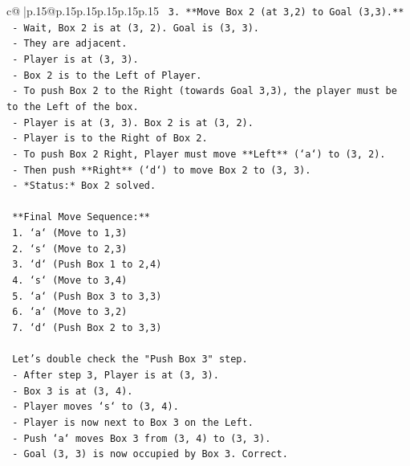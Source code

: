 \documentclass{article}
\begin{document}
{\begin{supertabular}{c@{$\;$}|p{.15\linewidth}@{}p{.15\linewidth}p{.15\linewidth}p{.15\linewidth}p{.15\linewidth}p{.15\linewidth}}
{{{\texttt{    3.  **Move Box 2 (at 3,2) to Goal (3,3).**} \\
\texttt{        {-} Wait, Box 2 is at (3, 2). Goal is (3, 3).} \\
\texttt{        {-} They are adjacent.} \\
\texttt{        {-} Player is at (3, 3).} \\
\texttt{        {-} Box 2 is to the Left of Player.} \\
\texttt{        {-} To push Box 2 to the Right (towards Goal 3,3), the player must be to the Left of the box.} \\
\texttt{        {-} Player is at (3, 3). Box 2 is at (3, 2).} \\
\texttt{        {-} Player is to the Right of Box 2.} \\
\texttt{        {-} To push Box 2 Right, Player must move **Left** (`a`) to (3, 2).} \\
\texttt{        {-} Then push **Right** (`d`) to move Box 2 to (3, 3).} \\
\texttt{        {-} *Status:* Box 2 solved.} \\
\\ 
\texttt{    **Final Move Sequence:**} \\
\texttt{    1.  `a` (Move to 1,3)} \\
\texttt{    2.  `s` (Move to 2,3)} \\
\texttt{    3.  `d` (Push Box 1 to 2,4)} \\
\texttt{    4.  `s` (Move to 3,4)} \\
\texttt{    5.  `a` (Push Box 3 to 3,3)} \\
\texttt{    6.  `a` (Move to 3,2)} \\
\texttt{    7.  `d` (Push Box 2 to 3,3)} \\
\\ 
\texttt{    Let's double check the "Push Box 3" step.} \\
\texttt{    {-} After step 3, Player is at (3, 3).} \\
\texttt{    {-} Box 3 is at (3, 4).} \\
\texttt{    {-} Player moves `s` to (3, 4).} \\
\texttt{    {-} Player is now next to Box 3 on the Left.} \\
\texttt{    {-} Push `a` moves Box 3 from (3, 4) to (3, 3).} \\
\texttt{    {-} Goal (3, 3) is now occupied by Box 3. Correct.} \\
\\ 
}}}
\end{supertabular}}
\end{document}
